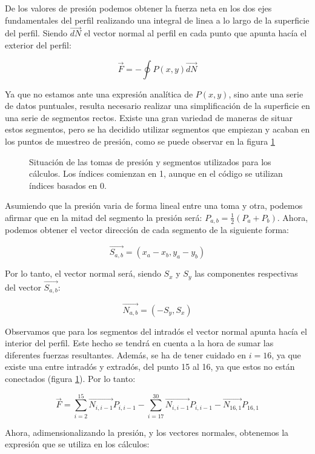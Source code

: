 \documentclass{article}
\begin{document}
De los valores de presión podemos obtener la fuerza neta en los dos ejes fundamentales del perfil realizando una integral
de linea a lo largo de la superficie del perfil. Siendo $\vec{dN}$ el vector normal al perfil en cada punto que apunta hacía
el exterior del perfil:

$$\vec{F} = - \oint P(x, y) \vec{dN}$$ 

Ya que no estamos ante una expresión analítica de $P(x, y)$, sino ante una serie de datos puntuales, resulta necesario realizar
una simplificación de la superficie en una serie de segmentos rectos. Existe una gran variedad de maneras de situar estos 
segmentos, pero se ha decidido utilizar segmentos que empiezan y acaban en los puntos de muestreo de presión, como se puede 
observar en la figura \ref{fig:NACA}

\begin{figure}[h!]
    
    \caption{Situación de las tomas de presión y segmentos utilizados para los cálculos. Los índices comienzan en 1,
    aunque en el código se utilizan índices basados en 0.}
    \label{fig:NACA}    
\end{figure}

Asumiendo que la presión varia de forma lineal entre una toma y otra, podemos afirmar que en la mitad del segmento la presión 
será: $P_{a, b} = \frac{1}{2}(P_{a} + P_{b})$. Ahora, podemos obtener el vector dirección de cada segmento de la 
siguiente forma:

$$\vec{S_{a,b}} = (x_{a} - x_{b}, y_{a} - y_{b})$$

Por lo tanto, el vector normal será, siendo $S_x$ y $S_y$ las componentes respectivas del vector $\vec{S_{a,b}}$:

$$\vec{N_{a, b}} = (-S_y, S_x)$$

Observamos que para los segmentos del intradós el vector normal apunta hacía el interior del perfil. Este hecho se tendrá
en cuenta a la hora de sumar las diferentes fuerzas resultantes. Además, se ha de tener cuidado en $i=16$, ya que existe 
una  entre intradós y extradós, del punto 15 al 16, ya que estos no están conectados (figura \ref{fig:NACA}). Por lo tanto:

$$\vec{F} = 
\sum_{i = 2}^{15} \vec{N_{i, i-1}} P_{i, i-1} - 
\sum_{i=17}^{30} \vec{N_{i, i-1}} P_{i, i-1} -
\vec{N_{16, 1}} P_{16, 1} $$

Ahora, adimensionalizando la presión, y los vectores normales, obtenemos la expresión que se utiliza en los cálculos:
\end{document}

